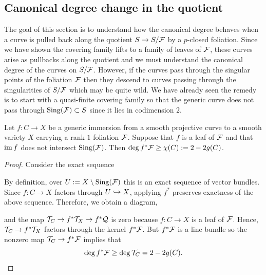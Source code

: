 \documentclass[main.tex]{subfiles}
\begin{document}
\subsection{Canonical degree change in the quotient}

The goal of this section is to understand how the canonical degree behaves when a curve is pulled back along the quotient $S \to S / \mathcal{F}$ by a $p$-closed foliation. Since we have shown the covering family lifts to a family of leaves of $\mathcal{F}$, these curves arise as pullbacks along the quotient and we must understand the canonical degree of the curves on $S / \mathcal{F}$. However, if the curves pass through the singular points of the foliation $\mathcal{F}$ then they descend to curves passing through the singularities of $S / \mathcal{F}$ which may be quite wild. We have already seen the remedy is to start with a quasi-finite covering family so that the generic curve does not pass through $\operatorname{\mathrm{Sing}}(\mathcal{F}) \subset S$ since it lies in codimension $2$. 

\begin{lemma} \label{lemma:degree_of_rank_1_foliation}
Let $f : C \to X$ be a generic immersion from a smooth projective curve to a smooth variety $X$ carrying a rank $1$ foliation $\mathcal{F}$. Suppose that $f$ is a leaf of $\mathcal{F}$ and that $\operatorname{\mathrm{im}}{f}$ does not intersect $\operatorname{\mathrm{Sing}}(\mathcal{F})$. Then $\deg{f^* \mathcal{F}} \ge \chi(C) := 2 - 2 g(C)$. 
\end{lemma}

\begin{proof}
Consider the exact sequence
\begin{center}
\end{center} 
By definition, over $U := X \setminus \operatorname{\mathrm{Sing}}(\mathcal{F})$ this is an exact sequence of vector bundles. Since $f : C \to X$ factors through $U \hookrightarrow X$, applying $f^*$ preserves exactness of the above sequence. Therefore, we obtain a diagram,
\begin{center}
\end{center}
and the map $\mathcal{T}_C \to f^* \mathcal{T}_X \to f^* \mathcal{Q}$ is zero because $f : C \to X$ is a leaf of $\mathcal{F}$. Hence, $\mathcal{T}_C \to f^* \mathcal{T}_X$ factors through the kernel $f^* \mathcal{F}$. But $f^* \mathcal{F}$ is a line bundle so the nonzero map $\mathcal{T}_C \to f^* \mathcal{F}$ implies that
\[ \deg{f^* \mathcal{F}} \ge \deg{\mathcal{T}_C} = 2 - 2 g(C). \]
\end{proof}
\end{document}
